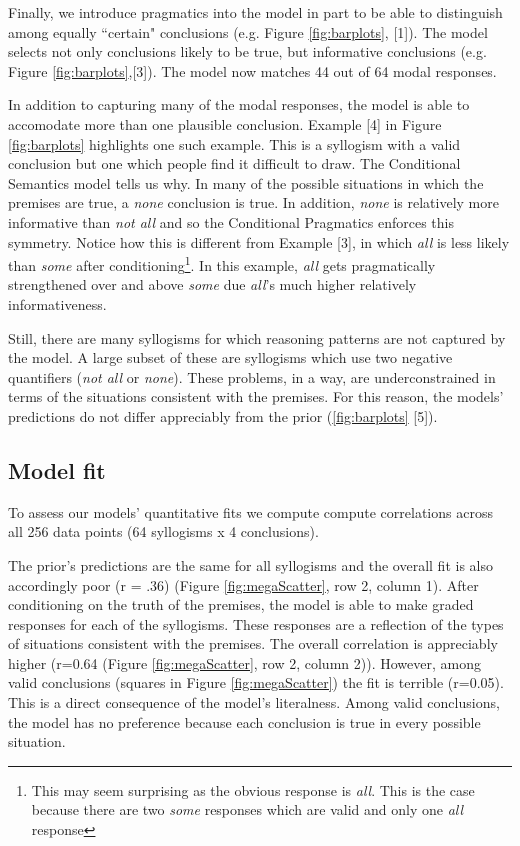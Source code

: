 \documentclass[10pt,letterpaper]{article}
\begin{document}
Finally, we introduce pragmatics into the model in part to be able to distinguish among equally ``certain" conclusions (e.g. Figure \ref{fig:barplots}, [1]). The model selects not only conclusions likely to be true, but informative conclusions (e.g. Figure \ref{fig:barplots},[3]). The model now matches 44 out of 64 modal responses. 

In addition to capturing many of the modal responses, the model is able to accomodate more than one plausible conclusion. Example [4] in Figure \ref{fig:barplots} highlights one such example. This is a syllogism with a valid conclusion but one which people find it difficult to draw. The Conditional Semantics model tells us why. In many of the possible situations in which the premises are true, a \emph{none} conclusion is true. In addition, \emph{none} is relatively more informative than \emph{not all} and so the Conditional Pragmatics enforces this symmetry. Notice how this is different from Example [3], in which \emph{all} is less likely than  \emph{some} after conditioning\footnote{This may seem surprising as the obvious response is \emph{all}. This is the case because there are two \emph{some} responses which are valid and only one \emph{all} response}. In this example, \emph{all} gets pragmatically strengthened over and above \emph{some} due \emph{all}'s much higher relatively informativeness.  

Still, there are many syllogisms for which reasoning patterns are not captured by the model. A large subset of these are syllogisms which use two negative quantifiers (\emph{not all} or \emph{none}). These problems, in a way, are underconstrained in terms of the situations consistent with the premises. For this reason, the models' predictions do not differ appreciably from the prior (\ref{fig:barplots} [5]).

\subsection{Model fit}

To assess our models' quantitative fits we compute compute correlations across all 256 data points (64 syllogisms x 4 conclusions).

The prior's predictions are the same for all syllogisms and the overall fit is also accordingly poor (r = .36) (Figure \ref{fig:megaScatter}, row 2, column 1).  After conditioning on the truth of the premises, the model is able to make graded responses for each of the syllogisms. These responses are a reflection of the types of situations consistent with the premises. The overall correlation is appreciably higher (r=0.64 (Figure \ref{fig:megaScatter}, row 2, column 2)). However, among valid conclusions (squares in Figure \ref{fig:megaScatter}) the fit is terrible (r=0.05). This is a direct consequence of the model's literalness. Among valid conclusions, the model has no preference because each conclusion is true in every possible situation.
\end{document}

